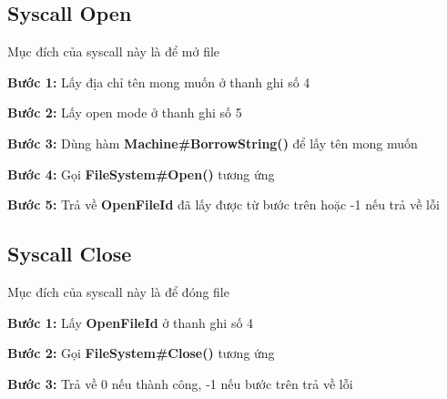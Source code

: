 \subsection{Syscall Open}
Mục đích của syscall này là để mở file
\begin{addmargin}[40pt]{0pt}
\textbf{Bước 1: }Lấy địa chỉ tên mong muốn ở thanh ghi số 4
\end{addmargin}
\begin{addmargin}[40pt]{0pt}
\textbf{Bước 2: }Lấy open mode ở thanh ghi số 5
\end{addmargin}
\begin{addmargin}[40pt]{0pt}
\textbf{Bước 3: }Dùng hàm \textbf{Machine\#BorrowString()} để lấy tên mong muốn
\end{addmargin}
\begin{addmargin}[40pt]{0pt}
\textbf{Bước 4: }Gọi \textbf{FileSystem\#Open()} tương ứng
\end{addmargin}
\begin{addmargin}[40pt]{0pt}
\textbf{Bước 5: }Trả về \textbf{OpenFileId} đã lấy được từ bước trên hoặc -1 nếu trả về lỗi
\end{addmargin}

\subsection{Syscall Close}
Mục đích của syscall này là để đóng file
\begin{addmargin}[40pt]{0pt}
\textbf{Bước 1: }Lấy \textbf{OpenFileId} ở thanh ghi số 4
\end{addmargin}
\begin{addmargin}[40pt]{0pt}
\textbf{Bước 2: }Gọi \textbf{FileSystem\#Close()} tương ứng
\end{addmargin}
\begin{addmargin}[40pt]{0pt}
\textbf{Bước 3: }Trả về 0 nếu thành công, -1 nếu bước trên trả về lỗi
\end{addmargin}

